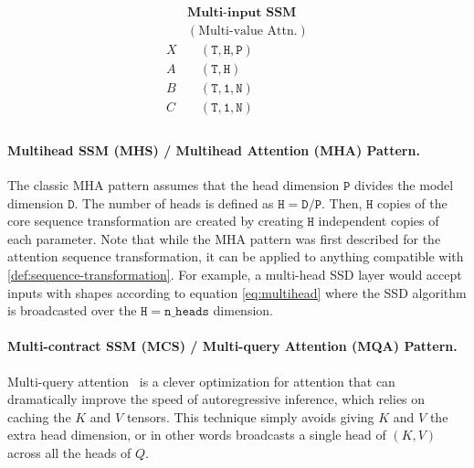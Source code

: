 \begin{minipage}[t]{.25\linewidth}
  \begin{equation}%
    \label{eq:multivalue}
    \begin{aligned}%
    & \textbf{Multi-input SSM} \\
    & (\textrm{Multi-value Attn.}) \\
      X & \quad \mathtt{(T, H, P)} \\
      A & \quad \mathtt{(T, H)} \\
      B & \quad \mathtt{(T, 1, N)} \\
      C & \quad \mathtt{(T, 1, N)} \\
    \end{aligned}
  \end{equation}
\end{minipage}

\paragraph{Multihead SSM (MHS) / Multihead Attention (MHA) Pattern.}

The classic MHA pattern assumes that the head dimension $\mathtt{P}$ divides the model dimension $\mathtt{D}$.
The number of heads is defined as $\mathtt{H} = \mathtt{D} / \mathtt{P}$.
Then, $\mathtt{H}$ copies of the core sequence transformation are created by creating $\mathtt{H}$ independent copies of each parameter.
Note that while the MHA pattern was first described for the attention sequence transformation,
it can be applied to anything compatible with \cref{def:sequence-transformation}.
For example, a multi-head SSD layer would accept inputs with shapes according to equation \eqref{eq:multihead}
where the SSD algorithm is broadcasted over the $\mathtt{H} = \mathtt{n\_heads}$ dimension.

%

\paragraph{Multi-contract SSM (MCS) / Multi-query Attention (MQA) Pattern.}

Multi-query attention~\citep{shazeer2019fast} is a clever optimization for attention that can dramatically improve the speed of autoregressive inference,
which relies on caching the $K$ and $V$ tensors.
This technique simply avoids giving $K$ and $V$ the extra head dimension,
or in other words broadcasts a single head of $(K, V)$ across all the heads of $Q$.

